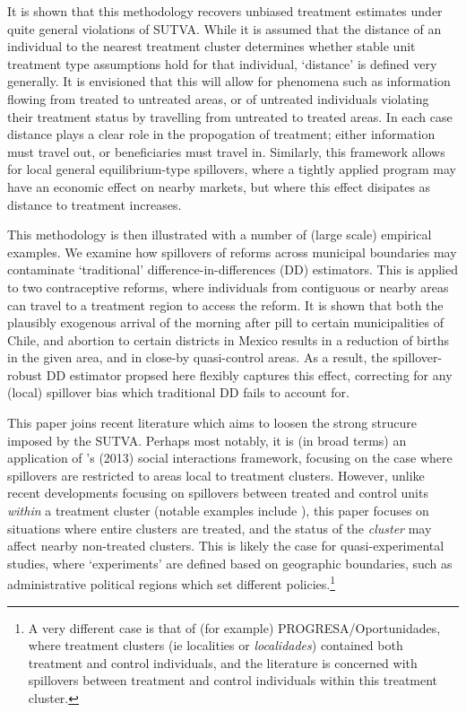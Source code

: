 \documentclass{article}
\begin{document}
\begin{spacing}{1.1}
It is shown that this methodology recovers unbiased treatment
estimates under quite general violations of SUTVA.  While it is
assumed that the distance of an individual to the nearest treatment
cluster determines whether stable unit treatment type assumptions hold
for that individual, `distance' is defined very generally.  It is
envisioned that this will allow for phenomena such as information
flowing from treated to untreated areas, or of untreated individuals
violating their treatment status by travelling from untreated to
treated areas.  In each case distance plays a clear role in the
propogation of treatment; either information must travel out, or
beneficiaries must travel in. Similarly, this framework allows for
local general equilibrium-type spillovers, where a tightly applied
program may have an economic effect on nearby markets, but where this
effect disipates as distance to treatment increases.

This methodology is then illustrated with a number of (large scale) empirical 
examples.  We examine how spillovers of reforms across municipal boundaries may 
contaminate `traditional' difference-in-differences (DD) estimators.  This is 
applied to two contraceptive reforms, where individuals from contiguous or nearby 
areas can travel to a treatment region to access the reform.  It is shown that 
both the plausibly exogenous arrival of the morning after pill to certain 
municipalities of Chile, and abortion to certain districts in Mexico results in 
a reduction of births in the given area, and in close-by quasi-control areas.  
As a result, the spillover-robust DD estimator propsed here flexibly captures 
this effect, correcting for any (local) spillover bias which traditional DD
fails to account for.

This paper joins recent literature which aims to loosen the strong strucure 
imposed by the SUTVA.  Perhaps most notably, it is (in broad terms) an 
application of \citeauthor{Manski2013}'s (2013) social interactions framework, 
focusing on the case where spillovers are restricted to areas local to treatment 
clusters.  However, unlike recent developments focusing on spillovers 
between treated and control units \emph{within} a treatment cluster (notable
examples include \citet{McIntosh2008,Bairdetal2014,AngelucciDiMaro2010}), this 
paper focuses on situations where entire clusters are treated, and the status
of the \emph{cluster} may affect nearby non-treated clusters.  This is likely
the case for quasi-experimental studies, where `experiments' are defined based
on geographic boundaries, such as administrative political regions which set 
different policies.\footnote{A very different case is that of (for example)
PROGRESA/Oportunidades, where treatment clusters (ie localities or 
\emph{localidades}) contained both treatment and control individuals, and the
literature is concerned with spillovers between treatment and control individuals
within this treatment cluster.}


\end{spacing}
\end{document}
